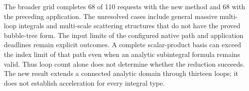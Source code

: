 The broader grid completes 68 of 110 requests with the new method and 68 with the preceding application. The unresolved cases include general massive multi-loop integrals and multi-scale scattering structures that do not have the proved bubble-tree form. The input limits of the configured native path and application deadlines remain explicit outcomes. A complete scalar-product basis can exceed the index limit of that path even when an analytic subintegral formula remains valid. Thus loop count alone does not determine whether the reduction succeeds. The new result extends a connected analytic domain through thirteen loops; it does not establish acceleration for every integral type.
\FloatBarrier

